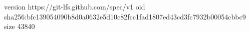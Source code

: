 version https://git-lfs.github.com/spec/v1
oid sha256:bfc139054090b8d0a0632e5d10c82fcc1fad1807ed43cd3fc7932b00054cbbc9
size 43840
